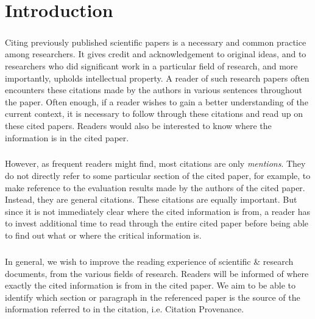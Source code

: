 \chapter{Introduction}
\label{introduction}
\paragraph{}
Citing previously published scientific papers is a necessary and common practice among researchers. It gives credit and acknowledgement to original ideas, and to researchers who did significant work in a particular field of research, and more importantly, upholds intellectual property. A reader of such research papers often encounters these citations made by the authors in various sentences throughout the paper. Often enough, if a reader wishes to gain a better understanding of the current context, it is necessary to follow through these citations and read up on these cited papers. Readers would also be interested to know where the information is in the cited paper.

\paragraph{}
However, as frequent readers might find, most citations are only \textit{mentions}. They do not directly refer to some particular section of the cited paper, for example, to make reference to the evaluation results made by the authors of the cited paper. Instead, they are general citations. These citations are equally important. But since it is not immediately clear where the cited information is from, a reader has to invest additional time to read through the entire cited paper before being able to find out what or where the critical information is.

\paragraph{}
In general, we wish to improve the reading experience of scientific \& research documents, from the various fields of research. Readers will be informed of where exactly the cited information is from in the cited paper. We aim to be able to identify which section or paragraph in the referenced paper is the source of the information referred to in the citation, i.e. Citation Provenance.